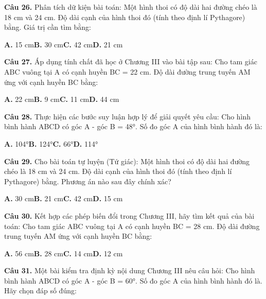 \documentclass[11pt,a4paper]{article}
\begin{document}
\textbf{\color{primary} Câu 26.} Phân tích dữ kiện bài toán: Một hình thoi có độ dài hai đường chéo là 18 cm và 24 cm. Độ dài cạnh của hình thoi đó (tính theo định lí Pythagore) bằng. Giá trị cần tìm bằng:\par
\hspace*{1.5em}\textbf{A.} 15 cm\quad\quad \textbf{B.} 30 cm\quad\quad \textbf{C.} 42 cm\quad\quad \textbf{D.} 21 cm\par\vspace{2pt}
\textbf{\color{primary} Câu 27.} Áp dụng tính chất đã học ở Chương III vào bài tập sau: Cho tam giác ABC vuông tại A có cạnh huyền BC = 22 cm. Độ dài đường trung tuyến AM ứng với cạnh huyền BC bằng:\par
\hspace*{1.5em}\textbf{A.} 22 cm\quad\quad \textbf{B.} 9 cm\quad\quad \textbf{C.} 11 cm\quad\quad \textbf{D.} 44 cm\par\vspace{2pt}
\textbf{\color{primary} Câu 28.} Thực hiện các bước suy luận hợp lý để giải quyết yêu cầu: Cho hình bình hành ABCD có góc A - góc B = 48°. Số đo góc A của hình bình hành đó là:\par
\hspace*{1.5em}\textbf{A.} 104°\quad\quad \textbf{B.} 124°\quad\quad \textbf{C.} 66°\quad\quad \textbf{D.} 114°\par\vspace{2pt}
\textbf{\color{primary} Câu 29.} Cho bài toán tự luyện (Tứ giác): Một hình thoi có độ dài hai đường chéo là 18 cm và 24 cm. Độ dài cạnh của hình thoi đó (tính theo định lí Pythagore) bằng. Phương án nào sau đây chính xác?\par
\hspace*{1.5em}\textbf{A.} 30 cm\quad\quad \textbf{B.} 21 cm\quad\quad \textbf{C.} 42 cm\quad\quad \textbf{D.} 15 cm\par\vspace{2pt}
\textbf{\color{primary} Câu 30.} Kết hợp các phép biến đổi trong Chương III, hãy tìm kết quả của bài toán: Cho tam giác ABC vuông tại A có cạnh huyền BC = 28 cm. Độ dài đường trung tuyến AM ứng với cạnh huyền BC bằng:\par
\hspace*{1.5em}\textbf{A.} 56 cm\quad\quad \textbf{B.} 28 cm\quad\quad \textbf{C.} 14 cm\quad\quad \textbf{D.} 12 cm\par\vspace{2pt}
\textbf{\color{primary} Câu 31.} Một bài kiểm tra định kỳ nội dung Chương III nêu câu hỏi: Cho hình bình hành ABCD có góc A - góc B = 60°. Số đo góc A của hình bình hành đó là. Hãy chọn đáp số đúng:\par
\end{document}
